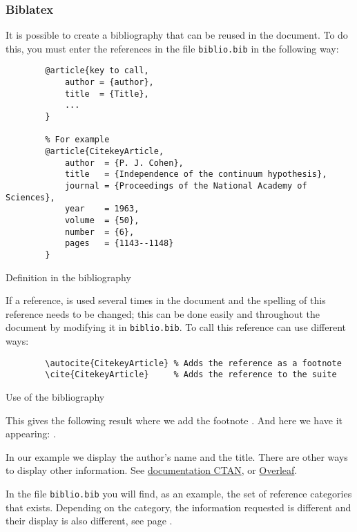 \subsubsection{Biblatex}
It is possible to create a bibliography that can be reused in the document.
To do this, you must enter the references in the file \verb=biblio.bib= in the following way:
\begin{code}
    \begin{verbatim}
        @article{key to call,
            author = {author},
            title  = {Title},
            ...
        }

        % For example
        @article{CitekeyArticle,
            author  = {P. J. Cohen},
            title   = {Independence of the continuum hypothesis},
            journal = {Proceedings of the National Academy of Sciences},
            year    = 1963,
            volume  = {50},
            number  = {6},
            pages   = {1143--1148}
        }
\end{verbatim}
    \caption{Definition in the bibliography}
\end{code}

If a reference, is used several times in the document and the spelling of this reference
needs to be changed; this can be done easily and throughout the document by modifying it in
\verb=biblio.bib=.
To call this reference can use different ways:
\begin{code}
    \begin{verbatim}
        \autocite{CitekeyArticle} % Adds the reference as a footnote
        \cite{CitekeyArticle}     % Adds the reference to the suite
\end{verbatim}
    \caption{Use of the bibliography}
\end{code}

This gives the following result where we add the footnote \autocite{CitekeyArticle}.
And here we have it appearing: \cite{CitekeyArticle}. \newline

In our example we display the author's name and the title. There are other ways to display other information.
See \href{https://mirror.ibcp.fr/pub/CTAN/macros/latex/contrib/biblatex/doc/biblatex.pdf#subsection.3.9}{documentation CTAN}, or \href{https://fr.overleaf.com/learn/latex/Bibliography_management_with_bibtex}{Overleaf}. \newline

In the file \verb=biblio.bib= you will find, as an example, the set of reference categories that exists.
Depending on the category, the information requested is different and their display is also different,
see page \pageref{bibliography}.

